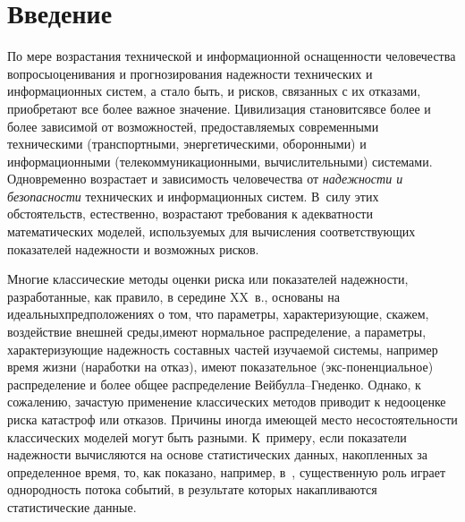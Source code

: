       \begin{multicols}{2}

            \label{st\stat}

\section{Введение}

По мере возрастания технической и информационной оснащенности
человечества вопросы\linebreak оценивания и прогнозирования надежности
технических и информационных систем, а стало быть, и рисков,
связанных с их отказами, приобретают все более важное значение.
Цивилизация становит\-ся\linebreak все более и более зависимой от возможностей,\linebreak
предоставляемых современными техническими (транспортными,
энергетическими, оборонными) и информационными
(телекоммуникационными, вычислительными) сис\-те\-ма\-ми. Одновременно
возрастает и зависимость человечества от {\it на\-деж\-ности и
безопасности} технических и информационных систем. В~силу этих
обстоятельств, естественно, возрастают требования к адекватности
математических моделей, используемых для вычисления соответствующих
показателей надежности и возможных рисков.

Многие классические методы оценки риска или показателей надежности,
разработанные, как правило, в середине XX~в., основаны на
идеальных\linebreak предположениях о том, что параметры, характеризующие,
скажем, воздействие внешней среды,\linebreak имеют нормальное распределение, а
параметры,\linebreak
 характеризующие на\-деж\-ность составных час\-тей изучаемой
системы, например время жизни (на\-ра\-бот\-ки на отказ), имеют
показательное (экс-\linebreak по\-нен\-ци\-аль\-ное) распределение и более общее
распределе\-ние Вей\-бул\-ла--Гне\-ден\-ко. Однако, к сожалению, за\-час\-тую
применение классических методов приводит к недооценке риска
катастроф или отказов. Причины иногда имеющей место
несостоятельности классических моделей могут быть разными. 
К~примеру, если показатели на\-деж\-ности вычисляются на осно\-ве
статистических данных, накопленных за определенное время, то, как
показано, например, в~\cite{BKSSh2007}, существенную роль играет
однородность потока событий, в результате которых накапливаются
статистические данные. 


\end{multicols}
